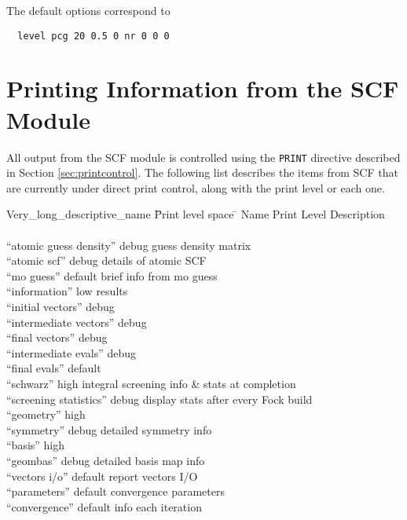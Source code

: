 The default options correspond to
\begin{verbatim}
  level pcg 20 0.5 0 nr 0 0 0
\end{verbatim}


\section{Printing Information from the SCF Module}
\label{sec:scfprint}

All output from the SCF module is controlled using the \verb+PRINT+
directive described in Section \ref{sec:printcontrol}.  The following 
list describes the items from SCF that are currently under direct 
print control, along with the print level or each one.

\begin{tabbing}
  Very\_long\_descriptive\_name \= Print level space \= \kill
  Name                    \> Print Level \> Description \\
                          \>        \> \\
 ``atomic guess density'' \> debug  \> guess density matrix \\
 ``atomic scf''           \> debug  \> details of atomic SCF \\
 ``mo guess''             \> default\> brief info from mo guess \\
 ``information''          \> low    \> results  \\
 ``initial vectors''      \> debug  \> \\
 ``intermediate vectors'' \> debug  \> \\
 ``final vectors''        \> debug  \> \\
 ``intermediate evals''   \> debug  \> \\
 ``final evals''          \> default\> \\
 ``schwarz''              \> high   \> integral screening info \&
  stats at completion\\
 ``screening statistics'' \> debug  \> display stats after every Fock build \\
 ``geometry''             \> high   \> \\
 ``symmetry''             \> debug  \> detailed symmetry info \\
 ``basis''                \> high   \> \\
 ``geombas''              \> debug  \> detailed basis map info \\
 ``vectors i/o''          \> default\> report vectors I/O \\
 ``parameters''           \> default\> convergence parameters \\
 ``convergence''          \> default\> info each iteration
\end{tabbing}

